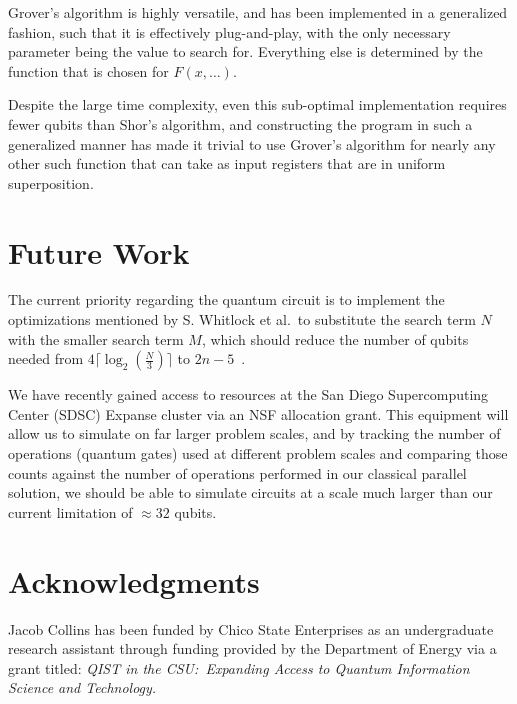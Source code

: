 \documentclass[twocolumn]{cinc}
\begin{document}
\balance

Grover's algorithm is highly versatile, and has been implemented in a
generalized fashion, such that it is effectively plug-and-play, with the
only necessary parameter being the value to search for. Everything else is
determined by the function that is chosen for $F(x, \dots)$.

Despite the large time complexity, even this sub-optimal implementation requires
fewer qubits than Shor's algorithm, and constructing the program in such a 
generalized manner has made it trivial to use Grover's algorithm for nearly any other
such function that can take as input registers that are in uniform superposition.

\section{Future Work}
 
The current priority regarding the quantum circuit is to implement the optimizations
mentioned by S. Whitlock et al.\ to substitute the search term $N$ with the smaller
search term $M$, which should reduce the number of qubits needed from 
$4 \lceil \log_2(\frac{N}{3})\rceil$ to $2n-5$\ \cite{quantum_factoring}.

We have recently gained access to resources at the San Diego Supercomputing 
Center (SDSC) Expanse cluster via an NSF allocation grant. This equipment will allow us to
simulate on far larger problem scales, and by tracking the number of operations (quantum gates)
used at different problem scales and comparing those counts against the number of operations
performed in our classical parallel solution, we should be able to simulate circuits at a scale
much larger than our current limitation of $\approx 32$ qubits.

\section*{Acknowledgments}  
% 
Jacob Collins has been funded by Chico State Enterprises as an undergraduate research assistant
through funding provided by the Department of Energy via a grant titled: \emph{QIST in the CSU:\ 
Expanding Access to Quantum Information Science and Technology.}


\end{document}
